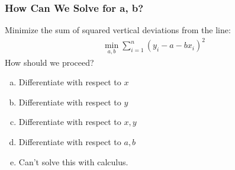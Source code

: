 \documentclass[handout]{beamer}
\begin{document}
\begin{frame}
\frametitle{How Can We Solve for a, b?}
\alert{Minimize the sum of squared vertical deviations from the line:}
\begin{eqnarray*}
\min_{a,b}  \sum_{i=1}^n (y_i - a - b x_i)^2
\end{eqnarray*}
How should we proceed?
\begin{enumerate}[(a)]
	\item Differentiate with respect to $x$
	\item Differentiate with respect to $y$
	\item Differentiate with respect to $x,y$
	\item Differentiate with respect to $a,b$
	\item Can't solve this with calculus.
\end{enumerate}
\end{frame}
\end{document}
